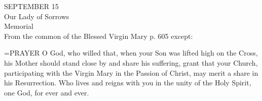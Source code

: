 \begin{center}\normalsize SEPTEMBER 15\\
\footnotesize Our Lady of Sorrows\\
\footnotesize Memorial\\
\footnotesize From the common of the Blessed Virgin Mary p. 605 except:\\
\end{center}

\hangindent=\parindent \small{PRAYER 
O God, who willed
that, when your Son was lifted high on the Cross,
his Mother should stand close by and share his suffering,
grant that your Church,
participating with the Virgin Mary in the Passion of Christ,
may merit a share in his Resurrection.
Who lives and reigns with you in the unity of the Holy Spirit,
one God, for ever and ever.\\}
 
